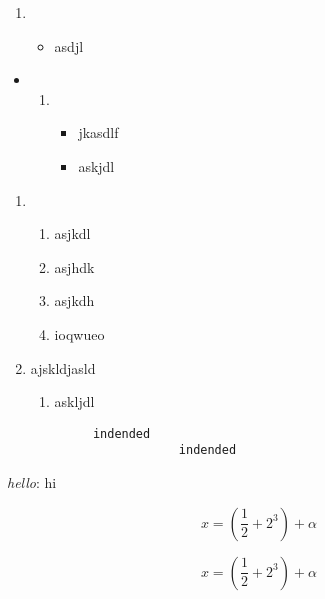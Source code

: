 \documentclass{article}
\begin{document}
    \begin{enumerate}
        \item {
        \begin{itemize}
            \item {
            asdjl
            }
        \end{itemize}
        }
    \end{enumerate}

    \begin{itemize}
        \item {
        \begin{enumerate}
            \item {
            \begin{itemize}
                \item jkasdlf
                \item {
                askjdl
                }
            \end{itemize}
            }
        \end{enumerate}
        }
    \end{itemize}

    \begin{enumerate}
        \item {
        \begin{enumerate}
            \item asjkdl
            \item {
            asjhdk
            }
            \item {asjkdh}
            \item {
            ioqwueo
            }
        \end{enumerate}
        }
        \item {
        ajskldjasld
        }
        \begin{enumerate}
            \item askljdl
        \end{enumerate}
    \end{enumerate}

    \begin{verbatim}
            indended
                        indended
    \end{verbatim}

    \textit{hello}: hi

    \[
        x = \left(\frac{1}{2} + 2^3\right) + \alpha
    \]

    \[
        x = \left(\frac{1}{2} + 2^3\right) +\alpha
    \]
\end{document}

